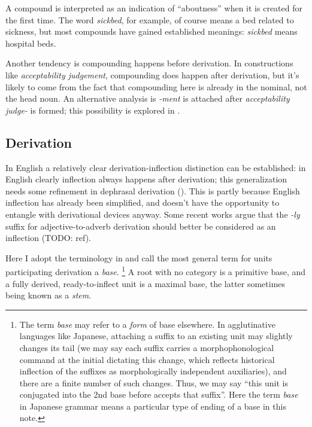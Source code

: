\documentclass[UTF8, a4paper, oneside, scheme=plain, 12pt]{ctexbook}
\newcommand*{\term}[1]{\emph{#1}}
\newcommand{\form}[1]{\emph{#1}}
\begin{document}
A compound is interpreted as an indication of ``aboutness''
when it is created for the first time.
The word \form{sickbed}, 
for example, of course means a bed related to sickness,
but most compounds have gained established meanings:
\form{sickbed} means hospital beds.

Another tendency is compounding happens before derivation.
In constructions like \form{acceptability judgement},
compounding does happen after derivation,
but it's likely to come from the fact that 
compounding here is already in the nominal,
not the head noun.
An alternative analysis is \form{-ment} is attached after 
\form{acceptability judge-} is formed; 
this possibility is explored in .

\subsection{Derivation}\label{sec:pos.overview.derivation.derivation}

In English a relatively clear derivation-inflection distinction can be established:
in English clearly inflection always happens after derivation;
this generalization needs some refinement in dephrasal derivation ().
This is partly because English inflection has already been simplified,
and doesn't have the opportunity to entangle with derivational devices anyway.
Some recent works argue that the \form{-ly} suffix for adjective-to-adverb derivation 
should better be considered as an inflection (TODO: ref).

Here I adopt the terminology in \citet{cgel}
and call the most general term for units participating derivation a \term{base}.%
\footnote{
    The term \term{base} may refer to a \emph{form} of base elsewhere.
    In agglutinative languages like Japanese,
    attaching a suffix to an existing unit may slightly changes its tail
    (we may say each suffix carries a morphophonological command at the initial
    dictating this change,
    which reflects historical inflection of the suffixes as 
    morphologically independent auxiliaries),
    and there are a finite number of such changes.
    Thus, we may say ``this unit is conjugated into the 2nd base before accepts that suffix''.
    Here the term \term{base} in Japanese grammar
    means a particular type of ending 
    of a base in this note.
}
A root with no category is a primitive base,
and a fully derived, ready-to-inflect unit is a maximal base,
the latter sometimes being known as a \term{stem}.
\end{document}
